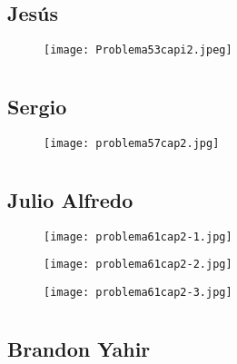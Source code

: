 \documentclass[12pt]{article}
\begin{document}
\subsection{{} Jesús}

\begin{figure}[htb] 
\centering \texttt{[image: Problema53capi2.jpeg]} 
\end{figure}
\newpage

\section{ }
\subsection{{} Sergio}

\begin{figure}[htb] 
\centering \texttt{[image: problema57cap2.jpg]} 
\end{figure}
\newpage

\section{ }
\subsection{{} Julio Alfredo}

\begin{figure}[htb] 
\centering \texttt{[image: problema61cap2-1.jpg]} 
\end{figure}
\newpage

\begin{figure}[htb] 
\centering \texttt{[image: problema61cap2-2.jpg]} 
\end{figure}
\newpage

\begin{figure}[htb] 
\centering \texttt{[image: problema61cap2-3.jpg]} 
\end{figure}
\newpage

\section{ }
\subsection{{} Brandon Yahir}
\end{document}
